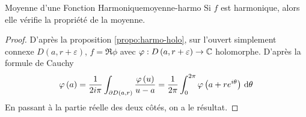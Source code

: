 \documentclass{cours}
\begin{document}
\begin{propositionfr}
	{Moyenne d'une Fonction Harmonique}{moyenne-harmo}
	Si $f$ est harmonique, alors elle vérifie la propriété de la moyenne.
\end{propositionfr}
\begin{proof}
	D'après la proposition \ref{propo:harmo-holo}, sur l'ouvert simplement connexe $D\left(a, r + \varepsilon\right)$, $f = \Re \phi$ avec $\varphi : D\left(a, r + \varepsilon\right) \to \mathbb{C}$ holomorphe. D'après la formule de Cauchy
	\begin{equation*}
		\varphi\left(a\right) = \frac{1}{2i\pi}\int_{\partial D\left(a, r\right)} \frac{\varphi\left(u\right)}{u - a} = \frac{1}{2\pi}\int_{0}^{2\pi}\varphi\left(a + re^{i\theta}\right) {\rm \, d} \theta
	\end{equation*}
	En passant à la partie réelle des deux côtés, on a le résultat. 
\end{proof}
\end{document}

